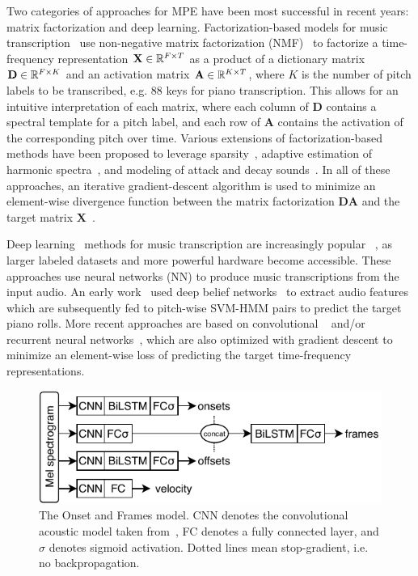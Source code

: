 Two categories of approaches for MPE have been most successful in recent years: matrix factorization and deep learning.
Factorization-based models for music transcription~\cite{smaragdis2003nmf} use non-negative matrix factorization (NMF)~\cite{lee2001nmf} to factorize a time-frequency representation $\mathbf{X} \in \mathbb{R}^{F \times T}$ as a product of a dictionary matrix $\mathbf{D} \in \mathbb{R}^{F \times K}$ and an activation matrix $\mathbf{A} \in \mathbb{R}^{K \times T}$, where $K$ is the number of pitch labels to be transcribed, e.g. 88 keys for piano transcription.
This allows for an intuitive interpretation of each matrix, where each column of $\mathbf{D}$ contains a spectral template for a pitch label, and each row of $\mathbf{A}$ contains the activation of the corresponding pitch over time.
Various extensions of factorization-based methods %
have been proposed to leverage sparsity~\cite{abdallah2004sparse}, adaptive estimation of harmonic spectra~\cite{vincent2010adaptive,fuentes2013harmonic}, and modeling of attack and decay sounds~\cite{benetos2013multi,ewert2016admm}.
In all of these approaches, an iterative gradient-descent algorithm is used to minimize an element-wise divergence function between the matrix factorization $\mathbf{DA}$ and the target matrix $\mathbf{X}$~\cite{fevotte2011nmf}.

Deep learning~\cite{lecun2015deeplearning} methods for music transcription are increasingly popular%
~\cite{benetos2019amt}, as larger labeled datasets and more powerful hardware become accessible.
These approaches use neural networks (NN) to produce music transcriptions from the input audio.
An early work~\cite{nam2011classification} used deep belief networks~\cite{hinton2006dbn} to extract audio features which are subsequently fed to pitch-wise SVM-HMM pairs to predict the target piano rolls.
More recent approaches are based on convolutional%
~\cite{bittner2017deepsalience,kelz2016framewise} and/or recurrent neural networks~\cite{bock2012rnn,sigtia2016endtoend,hawthorne2018onsetsframes}, which are also optimized with gradient descent to minimize an element-wise loss of predicting the target time-frequency representations.

\begin{figure}[t]
	\centering
	\includegraphics[width=0.8\columnwidth]{onsetsframes.pdf}
	\caption{The Onset and Frames model. CNN denotes the convolutional acoustic model taken from~\protect\cite{kelz2016framewise}, FC denotes a fully connected layer, and $\sigma$ denotes sigmoid activation. Dotted lines mean stop-gradient, i.e. no backpropagation.}
	\label{fig:onsetsframes}
\end{figure}


